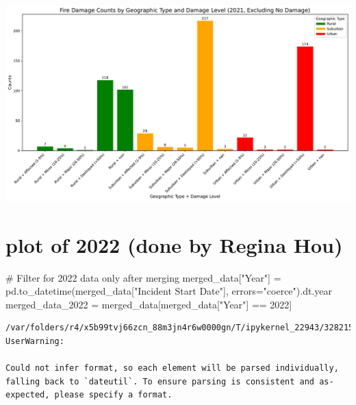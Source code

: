 \documentclass[
  letterpaper,
  DIV=11,
  numbers=noendperiod]{scrartcl}
\newenvironment{Shaded}{\begin{snugshade}}{\end{snugshade}}
\newcommand{\CommentTok}[1]{\textcolor[rgb]{0.37,0.37,0.37}{#1}}
\newcommand{\DecValTok}[1]{\textcolor[rgb]{0.68,0.00,0.00}{#1}}
\newcommand{\NormalTok}[1]{\textcolor[rgb]{0.00,0.23,0.31}{#1}}
\newcommand{\OperatorTok}[1]{\textcolor[rgb]{0.37,0.37,0.37}{#1}}
\newcommand{\StringTok}[1]{\textcolor[rgb]{0.13,0.47,0.30}{#1}}
\begin{document}
\includegraphics{Final Code_files/figure-pdf/cell-14-output-1.pdf}

\section{plot of 2022 (done by Regina
Hou)}\label{plot-of-2022-done-by-regina-hou}

\begin{Shaded}
\begin{Highlighting}[]
\CommentTok{\# Filter for 2022 data only after merging}
\NormalTok{merged\_data[}\StringTok{"Year"}\NormalTok{] }\OperatorTok{=}\NormalTok{ pd.to\_datetime(merged\_data[}\StringTok{"Incident Start Date"}\NormalTok{], errors}\OperatorTok{=}\StringTok{"coerce"}\NormalTok{).dt.year}
\NormalTok{merged\_data\_2022 }\OperatorTok{=}\NormalTok{ merged\_data[merged\_data[}\StringTok{"Year"}\NormalTok{] }\OperatorTok{==} \DecValTok{2022}\NormalTok{]}
\end{Highlighting}
\end{Shaded}

\begin{verbatim}
/var/folders/r4/x5b99tvj66zcn_88m3jn4r6w0000gn/T/ipykernel_22943/3282159924.py:2: UserWarning:

Could not infer format, so each element will be parsed individually, falling back to `dateutil`. To ensure parsing is consistent and as-expected, please specify a format.
\end{verbatim}
\end{document}
